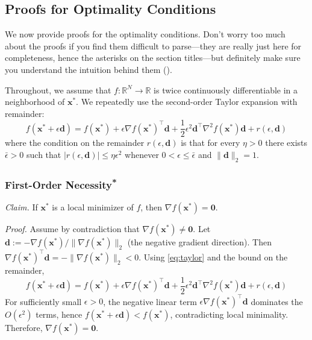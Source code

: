 \subsection{Proofs for Optimality Conditions}
We now provide proofs for the optimality conditions. Don't worry too much about the proofs if you find them difficult to parse---they are really just here for completeness, hence the asterisks on the section titles---but definitely make sure you understand the intuition behind them ().

Throughout, we assume that $f:\mathbb{R}^N\to\mathbb{R}$ is twice continuously differentiable in a neighborhood of $\mathbf{x}^*$. We repeatedly use the second-order Taylor expansion with remainder:
\begin{equation}\label{eq:taylor}
f(\mathbf{x}^* + \epsilon \mathbf{d})
= f(\mathbf{x}^*) 
  + \epsilon \nabla f(\mathbf{x}^*)^\top \mathbf{d}
  + \frac{1}{2}\epsilon^2 \mathbf{d}^\top \nabla^2 f(\mathbf{x}^*) \mathbf{d}
  + r(\epsilon,\mathbf{d})
\end{equation}
where the condition on the remainder $r(\epsilon,\mathbf{d})$ is that for every $\eta>0$ there exists $\bar{\epsilon}>0$ such that 
$\bigl|r(\epsilon,\mathbf{d})\bigr|\le \eta \epsilon^2$ whenever $0<\epsilon\le \bar{\epsilon}$ and $\|\mathbf{d}\|_2=1$.

\subsubsection{\texorpdfstring{First-Order Necessity\textsuperscript{*}}{First-Order Necessity}}
\emph{Claim.} If $\mathbf{x}^*$ is a local minimizer of $f$, then $\nabla f(\mathbf{x}^*)=\mathbf{0}$.

\emph{Proof.}
Assume by contradiction that $\nabla f(\mathbf{x}^*)\neq \mathbf{0}$. Let $\mathbf{d} := -\nabla f(\mathbf{x}^*)/\|\nabla f(\mathbf{x}^*)\|_2$ (the negative gradient direction). Then $\nabla f(\mathbf{x}^*)^\top \mathbf{d} = -\|\nabla f(\mathbf{x}^*)\|_2 < 0$. Using \autoref{eq:taylor} and the bound on the remainder,
\begin{equation}
f(\mathbf{x}^* + \epsilon \mathbf{d})
= f(\mathbf{x}^*) + \epsilon \nabla f(\mathbf{x}^*)^\top \mathbf{d} 
  + \frac{1}{2}\epsilon^2 \mathbf{d}^\top \nabla^2 f(\mathbf{x}^*) \mathbf{d} + r(\epsilon,\mathbf{d})
\end{equation}
For sufficiently small $\epsilon>0$, the negative linear term $\epsilon \nabla f(\mathbf{x}^*)^\top \mathbf{d}$ dominates the $O(\epsilon^2)$ terms, hence
$f(\mathbf{x}^*+\epsilon \mathbf{d}) < f(\mathbf{x}^*)$, contradicting local minimality. Therefore, $\nabla f(\mathbf{x}^*)=\mathbf{0}$.

